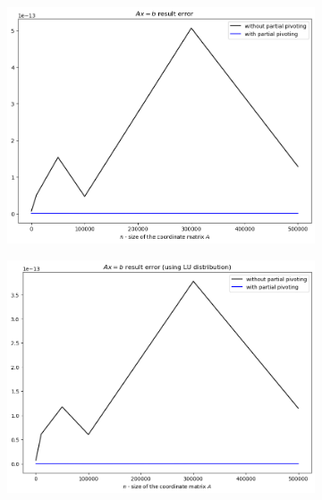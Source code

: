 \documentclass[11pt]{article}
\begin{document}
    \begin{figure}[htbp]
    \centering
        \begin{subfigure}[b]{0.45\textwidth}
            \includegraphics[width=\linewidth]{img/error.png}
        \end{subfigure}
        \hfill
        \begin{subfigure}[b]{0.45\textwidth}
            \includegraphics[width=\linewidth]{img/error_lu.png}
        \end{subfigure}
    \end{figure}
\end{document}
